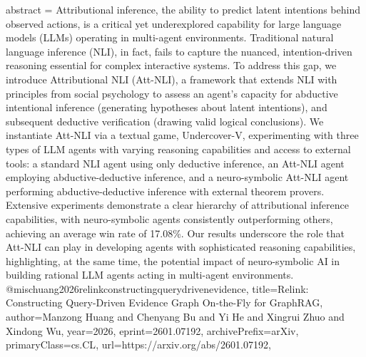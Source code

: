 {      abstract = {Attributional inference, the ability to predict latent intentions behind observed actions, is a critical yet underexplored capability for large language models (LLMs) operating in multi-agent environments. Traditional natural language inference (NLI), in fact, fails to capture the nuanced, intention-driven reasoning essential for complex interactive systems. To address this gap, we introduce Attributional NLI (Att-NLI), a framework that extends NLI with principles from social psychology to assess an agent's capacity for abductive intentional inference (generating hypotheses about latent intentions), and subsequent deductive verification (drawing valid logical conclusions). We instantiate Att-NLI via a textual game, Undercover-V, experimenting with three types of LLM agents with varying reasoning capabilities and access to external tools: a standard NLI agent using only deductive inference, an Att-NLI agent employing abductive-deductive inference, and a neuro-symbolic Att-NLI agent performing abductive-deductive inference with external theorem provers. Extensive experiments demonstrate a clear hierarchy of attributional inference capabilities, with neuro-symbolic agents consistently outperforming others, achieving an average win rate of 17.08\%. Our results underscore the role that Att-NLI can play in developing agents with sophisticated reasoning capabilities, highlighting, at the same time, the potential impact of neuro-symbolic AI in building rational LLM agents acting in multi-agent environments.}
}@misc{huang2026relinkconstructingquerydrivenevidence,
      title={Relink: Constructing Query-Driven Evidence Graph On-the-Fly for GraphRAG}, 
      author={Manzong Huang and Chenyang Bu and Yi He and Xingrui Zhuo and Xindong Wu},
      year={2026},
      eprint={2601.07192},
      archivePrefix={arXiv},
      primaryClass={cs.CL},
      url={https://arxiv.org/abs/2601.07192},
}
